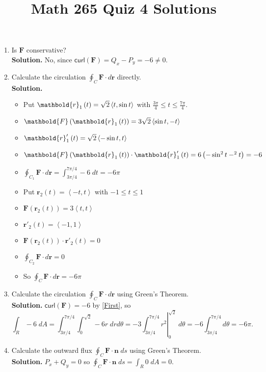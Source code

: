 \documentclass[12pt]{article}
\title{Math 265 Quiz 4 Solutions}\author{}\date{}
\let\cos\relax\DeclareMathOperator{\cos}{\mathsf{cos}}
\begin{document}
\maketitle
\thispagestyle{empty}
\begin{enumerate}
\item\label{First} Is $\mathbold{F}$ conservative?\\
{\bf Solution.}
No, since $\mathsf{curl}\left(\mathbold{F}\right)
=Q_x-P_y=-6\ne 0$.
\item Calculate the circulation $\oint_C\mathbold{F}
\cdot d\mathbold{r}$ directly.\\
{\bf Solution.}
\begin{itemize}
\item Put $\mathbold{r}_1\left(t\right)=\sqrt{2}
\left\langle \cos{t},\sin{t}\right\rangle$
with $\frac{3\pi}{4}
\le t\le\frac{7\pi}{4}$.
\item $\mathbold{F}\left(\mathbold{r}_1\left(t\right)\right)
=3\sqrt{2}
\left\langle \sin{t},-\cos{t}\right\rangle$
\item $\mathbold{r}'_1\left(t\right)
=\sqrt{2}\left\langle -\sin{t},\cos{t}\right\rangle$
\item $\mathbold{F}\left(\mathbold{r}_1\left(t\right)\right)
\cdot\mathbold{r}'_1\left(t\right)
=6\left(-\sin^2{t}-\cos^2{t}\right)=-6$
\item $\oint_{C_1}\mathbold{F} \cdot d\mathbold{r}
=\int_{3\pi/4}^{7\pi/4}-6\;dt=-6\pi$
\item Put $\mathbold{r}_2\left(t\right)=
\left\langle -t,t\right\rangle$ with $-1\le t\le 1$
\item $\mathbold{F}\left(\mathbold{r}_2\left(t\right)\right)
=3\left\langle t,t\right\rangle$
\item $\mathbold{r}'_2\left(t\right)
=\left\langle -1,1\right\rangle$
\item $\mathbold{F}\left(\mathbold{r}_2\left(t\right)\right)
\cdot\mathbold{r}'_2\left(t\right)=0$
\item $\oint_{C_2}\mathbold{F} \cdot d\mathbold{r}=0$
\item So $\oint_C\mathbold{F} \cdot d\mathbold{r}=-6\pi$
\end{itemize}
\item Calculate the circulation $\oint_C\mathbold{F}
\cdot d\mathbold{r}$ using Green's Theorem.\\
{\bf Solution.}
$\mathsf{curl}\left(\mathbold{F}\right)=-6$ by
\ref{First}, so
\[\int_R-6\;dA=\int_{3\pi/4}^{7\pi/4}\int_0^{\sqrt{2}}-6r
\;drd\theta
=-3\left.\int_{3\pi/4}^{7\pi/4}r^2\right|_0^{\sqrt{2}}\;d\theta
=-6\int_{3\pi/4}^{7\pi/4}d\theta=-6\pi.\]

\item Calculate the outward flux $\oint_C\mathbold{F}
\cdot\mathbold{n}\;ds$ using Green's Theorem.\\
{\bf Solution.}
$P_x+Q_y=0$ so
$\oint_C\mathbold{F}
\cdot\mathbold{n}\;ds=\int_R0\;dA=0$.
\end{enumerate}
\end{document}
